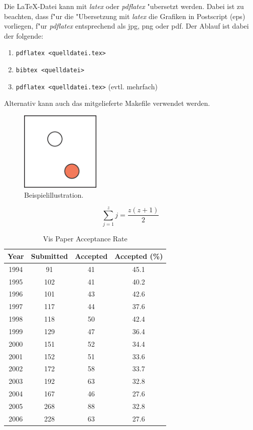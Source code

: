 \documentclass[journal]{vgtc}
\begin{document}
Die \LaTeX-Datei kann mit \emph{latex} oder \emph{pdflatex} "ubersetzt
werden. Dabei ist zu beachten, dass f"ur die "Ubersetzung mit
\emph{latex} die Grafiken in Postscript (eps) vorliegen, f"ur
\emph{pdflatex} entsprechend als jpg, png oder pdf.  Der Ablauf ist
dabei der folgende:
\begin{enumerate}
\item \verb|pdflatex <quelldatei.tex>|
\item \verb|bibtex <quelldatei>|
\item \verb|pdflatex <quelldatei.tex>| (evtl. mehrfach)
\end{enumerate}
Alternativ kann auch das mitgelieferte Makefile verwendet werden.








\begin{figure}[tb]
  \centering
  \includegraphics[width=1.5in]{sample}
  \caption{\label{fig:sample} Beispielillustration.}
\end{figure}

\begin{equation}
  \sum_{j=1}^{z} j = \frac{z(z+1)}{2}
\end{equation}

\begin{table}
  \caption{\label{tab:vis_accept} Vis Paper Acceptance Rate}
  \scriptsize
  \begin{center}
    \begin{tabular}{cccc}
      Year & Submitted & Accepted & Accepted (\%)\\
      \hline
      1994 &  91 & 41 & 45.1\\
      1995 & 102 & 41 & 40.2\\
      1996 & 101 & 43 & 42.6\\
      1997 & 117 & 44 & 37.6\\
      1998 & 118 & 50 & 42.4\\
      1999 & 129 & 47 & 36.4\\
      2000 & 151 & 52 & 34.4\\
      2001 & 152 & 51 & 33.6\\
      2002 & 172 & 58 & 33.7\\
      2003 & 192 & 63 & 32.8\\
      2004 & 167 & 46 & 27.6\\
      2005 & 268 & 88 & 32.8\\
      2006 & 228 & 63 & 27.6
    \end{tabular}
  \end{center}
\end{table}
\end{document}
